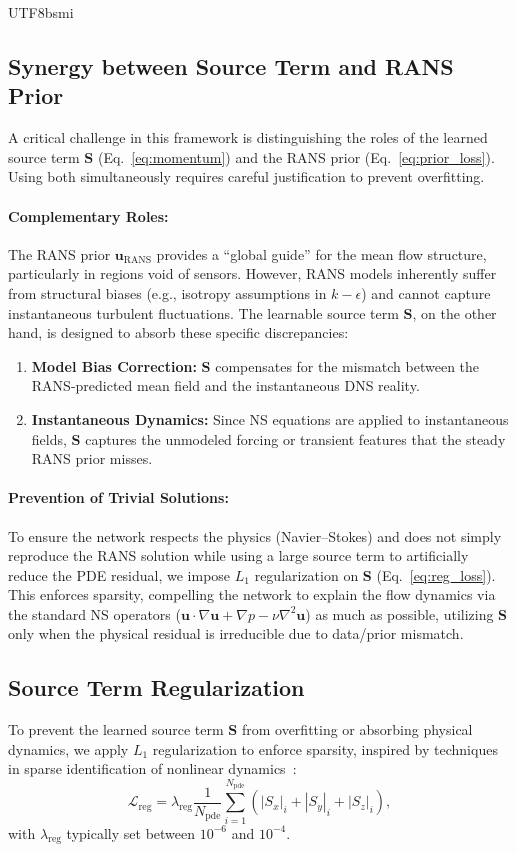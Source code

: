 \documentclass[master]{NTHUthesis}
\begin{document}
\begin{CJK*}{UTF8}{bsmi}
\subsection{Synergy between Source Term and RANS Prior}
A critical challenge in this framework is distinguishing the roles of the learned source term $\mathbf{S}$ (Eq.~\ref{eq:momentum}) and the RANS prior (Eq.~\ref{eq:prior_loss}). 
Using both simultaneously requires careful justification to prevent overfitting.

\paragraph{Complementary Roles:}
The RANS prior $\mathbf{u}_{\text{RANS}}$ provides a ``global guide'' for the mean flow structure, particularly in regions void of sensors. However, RANS models inherently suffer from structural biases (e.g., isotropy assumptions in $k-\epsilon$) and cannot capture instantaneous turbulent fluctuations.
The learnable source term $\mathbf{S}$, on the other hand, is designed to absorb these specific discrepancies:
\begin{enumerate}
    \item \textbf{Model Bias Correction:} $\mathbf{S}$ compensates for the mismatch between the RANS-predicted mean field and the instantaneous DNS reality.
    \item \textbf{Instantaneous Dynamics:} Since NS equations are applied to instantaneous fields, $\mathbf{S}$ captures the unmodeled forcing or transient features that the steady RANS prior misses.
\end{enumerate}

\paragraph{Prevention of Trivial Solutions:}
To ensure the network respects the physics (Navier--Stokes) and does not simply reproduce the RANS solution while using a large source term to artificially reduce the PDE residual, we impose $L_1$ regularization on $\mathbf{S}$ (Eq.~\ref{eq:reg_loss}).
This enforces sparsity, compelling the network to explain the flow dynamics via the standard NS operators ($\mathbf{u} \cdot \nabla \mathbf{u} + \nabla p - \nu \nabla^2 \mathbf{u}$) as much as possible, utilizing $\mathbf{S}$ only when the physical residual is irreducible due to data/prior mismatch.

\subsection{Source Term Regularization}
To prevent the learned source term $\mathbf{S}$ from overfitting or absorbing physical dynamics, we apply $L_1$ regularization to enforce sparsity, inspired by techniques in sparse identification of nonlinear dynamics~\cite{Raissi2020Science}:
\begin{equation}
    \label{eq:reg_loss}
    \mathcal{L}_{\text{reg}} = \lambda_{\text{reg}} \frac{1}{N_{\text{pde}}} \sum_{i=1}^{N_{\text{pde}}} \left( |S_x|_i + |S_y|_i + |S_z|_i \right),
\end{equation}
with $\lambda_{\text{reg}}$ typically set between $10^{-6}$ and $10^{-4}$.


\end{CJK*}
\end{document}
